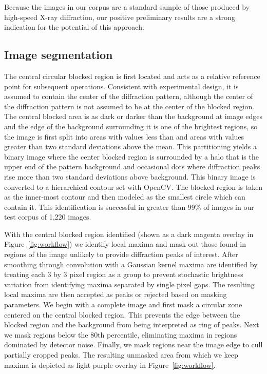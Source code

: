 \documentclass{sig-alternate}
\begin{document}
Because the images in our corpus are a standard sample of those
produced by high-speed X-ray diffraction, our positive preliminary
results are a strong indication for the potential of this approach.

\subsection{Image segmentation}

The central circular blocked region is first located and acts as a
relative reference point for subsequent operations. Consistent with
experimental design, it is assumed to contain the center of the
diffraction pattern, although the center of the diffraction pattern is
not assumed to be at the center of the blocked region. The central
blocked area is as dark or darker than the background at image edges
and the edge of the background surrounding it is one of the brightest
regions, so the image is first split into areas with values less than
and areas with values greater than two standard deviations above the
mean. This partitioning yields a binary image where the center blocked
region is surrounded by a halo that is the upper end of the pattern
background and occasional dots where diffraction peaks rise more than
two standard deviations above background. This binary image is
converted to a hierarchical contour set with OpenCV. The blocked
region is taken as the inner-most contour and then modeled as the
smallest circle which can contain it. This identification is
successful in greater than 99\% of images in our test corpus of 1,220
images.

With the central blocked region identified (shown as a dark magenta
overlay in Figure~\ref{fig:workflow}) we identify local maxima and
mask out those found in regions of the image unlikely to provide
diffraction peaks of interest.  After smoothing through convolution
with a Gaussian kernel maxima are identified by treating each 3 by 3
pixel region as a group to prevent stochastic brightness variation
from identifying maxima separated by single pixel gaps. The resulting
local maxima are then accepted as peaks or rejected based on masking
parameters.  We begin with a complete image and first mask a circular
zone centered on the central blocked region. This prevents the edge
between the blocked region and the background from being interpreted
as ring of peaks. Next we mask regions below the 80th percentile,
eliminating maxima in regions dominated by detector noise. Finally, we
mask regions near the image edge to cull partially cropped peaks. The
resulting unmasked area from which we keep maxima is depicted as light
purple overlay in Figure~\ref{fig:workflow}.
\end{document}
